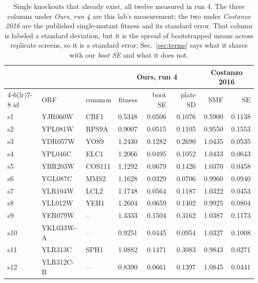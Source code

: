 \begin{table}[H]\centering
\footnotesize
\caption[]{Single knockouts that already exist, all twelve measured in run 4. The three columns under \emph{Ours, run 4} are this lab's measurement; the two under \emph{Costanzo 2016} are the published single-mutant fitness and its standard error. That column is labeled a standard deviation, but it is the spread of bootstrapped means across replicate screens, so it is a standard error; Sec.~\ref{sec:terms} says what it shares with our \emph{boot SE} and what it does not.}\label{tab:existing-singles}
\begin{tabular}{lllrrrrr}
\toprule
& & & \multicolumn{3}{c}{Ours, run 4} & \multicolumn{2}{c}{Costanzo 2016} \\
\cmidrule(lr){4-6}\cmidrule(lr){7-8}
id & ORF & common & fitness & boot SE & plate SD & SMF & SE \\
\midrule
s1 & YJR060W & CBF1 & 0.5348 & 0.0506 & 0.1076 & 0.5900 & 0.1138 \\
s2 & YPL081W & RPS9A & 0.9007 & 0.0515 & 0.1105 & 0.9550 & 0.1553 \\
s3 & YDR057W & YOS9 & 1.2430 & 0.1282 & 0.2690 & 1.0435 & 0.0535 \\
s4 & YPL046C & ELC1 & 1.2066 & 0.0495 & 0.1052 & 1.0433 & 0.0643 \\
s5 & YBR203W & COS111 & 1.1292 & 0.0679 & 0.1426 & 1.0370 & 0.0458 \\
s6 & YGL087C & MMS2 & 1.1628 & 0.0329 & 0.0706 & 0.9960 & 0.0940 \\
s7 & YLR104W & LCL2 & 1.1748 & 0.0564 & 0.1187 & 1.0322 & 0.0453 \\
s8 & YLL012W & YEH1 & 1.2604 & 0.0659 & 0.1402 & 0.9925 & 0.0804 \\
s9 & YER079W & -- & 1.3333 & 0.1504 & 0.3162 & 1.0387 & 0.1173 \\
s10 & YKL033W-A & -- & 0.9251 & 0.0445 & 0.0954 & 1.0327 & 0.1008 \\
s11 & YLR313C & SPH1 & 1.0882 & 0.1471 & 0.3083 & 0.9843 & 0.0271 \\
s12 & YLR312C-B & -- & 0.8390 & 0.0661 & 0.1397 & 1.0845 & 0.0441 \\
\bottomrule
\end{tabular}
\end{table}
